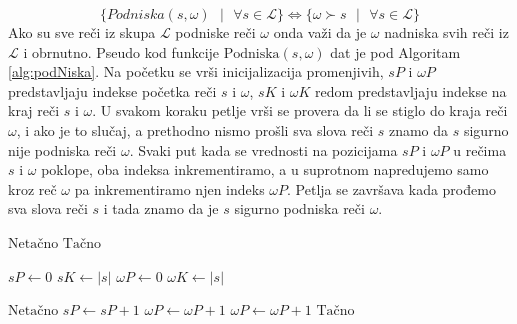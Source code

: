 \documentclass[12pt,oneside]{memoir}
\begin{document}
\begin{equation}
  \label{eqn:podniskaNadniska}
  \{Podniska(s,\omega) \textrm{ }| \textrm{ } \forall s \in \mathcal{L} \} 
  \Longleftrightarrow 
  \{\omega\succ s \textrm{ }| \textrm{ } \forall s \in\mathcal{L}\} 
\end{equation}
Ako su sve reči iz skupa $\mathcal{L}$ podniske reči $\omega$ onda važi da je $\omega$ nadniska svih reči
iz $\mathcal{L}$ i obrnutno. Pseudo kod funkcije $\textrm{Podniska}(s,\omega)$ dat je pod Algoritam \ref{alg:podNiska}.
Na početku se vrši inicijalizacija promenjivih, $sP$ i $\omega P$ predstavljaju indekse početka reči $s$ i $\omega$,
$sK$ i $\omega K$ redom predstavljaju indekse na kraj reči $s$ i $\omega$.
U svakom koraku petlje vrši se provera da li se stiglo do kraja reči $\omega$, i ako je to slučaj, a prethodno nismo prošli sva
slova reči $s$ znamo da $s$ sigurno nije podniska reči $\omega$. Svaki put kada se vrednosti na pozicijama $sP$ i 
$\omega P$ u rečima $s$ i $\omega$ poklope, oba indeksa inkrementiramo, a u suprotnom napredujemo samo kroz reč
$\omega$ pa inkrementiramo njen indeks $\omega P$. Petlja se završava kada prođemo sva slova reči $s$ i tada znamo
da je $s$ sigurno podniska reči $\omega$.
\\
\begin{algorithm}
  \caption{$\textrm{ZajedničkaNadniska}(\omega)$}
  \label{alg:zajNad}
  \begin{algorithmic}[1]
    \State \Return $\textrm{Netačno}$
    \EndIf
  \EndFor
  \State
  \State \Return $\textrm{Tačno}$
  \end{algorithmic}
  \end{algorithm}
  \begin{algorithm}
    \caption{$\textrm{Podniska}(s,\omega)$}
    \label{alg:podNiska}
    \begin{algorithmic}[1]
    \State $sP \gets 0$ 
    \State $sK \gets |s|$ 
    \State $\omega P \gets 0$ 
    \State $\omega K \gets |s|$ 

    \State
        \State \Return $\textrm{Netačno}$
        \State $sP \gets sP + 1$
        \State $\omega P \gets \omega P + 1$
      \Else
        \State $\omega P \gets \omega P + 1$
      \EndIf
    \EndWhile
    \State
    \State \Return $\textrm{Tačno}$
    \end{algorithmic}
    \end{algorithm}
\end{document}

